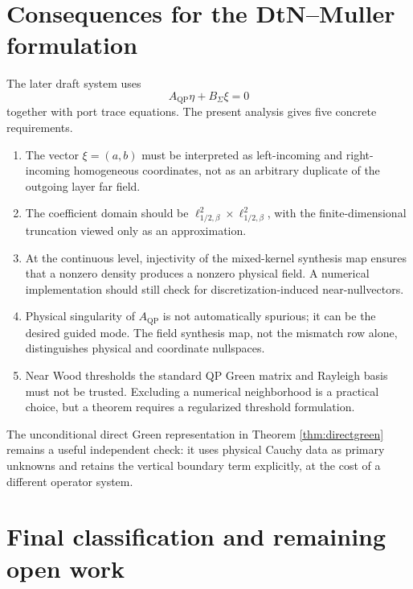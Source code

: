 \documentclass[11pt]{article}
\newcommand{\Sig}{\Sigma}
\newcommand{\QP}{\mathrm{QP}}
\theoremstyle{plain}
\theoremstyle{definition}
\theoremstyle{remark}
\begin{document}
\section{Consequences for the DtN--Muller formulation}

The later draft system uses
\[
A_{\QP}\eta+B_\Sig\xi=0
\]
together with port trace equations.  The present analysis gives five concrete
requirements.

\begin{enumerate}
\item The vector \(\xi=(a,b)\) must be interpreted as left-incoming and
right-incoming homogeneous coordinates, not as an arbitrary duplicate of the
outgoing layer far field.
\item The coefficient domain should be
\(\ell^2_{1/2,\beta}\times\ell^2_{1/2,\beta}\), with the finite-dimensional
truncation viewed only as an approximation.
\item At the continuous level, injectivity of the mixed-kernel synthesis map
ensures that a nonzero density produces a nonzero physical field.  A numerical
implementation should still check for discretization-induced near-nullvectors.
\item Physical singularity of \(A_{\QP}\) is not automatically spurious; it
can be the desired guided mode.  The field synthesis map, not the mismatch row
alone, distinguishes physical and coordinate nullspaces.
\item Near Wood thresholds the standard QP Green matrix and Rayleigh basis
must not be trusted.  Excluding a numerical neighborhood is a practical choice,
but a theorem requires a regularized threshold formulation.
\end{enumerate}

The unconditional direct Green representation in Theorem
\ref{thm:directgreen} remains a useful independent check: it uses physical
Cauchy data as primary unknowns and retains the vertical boundary term
explicitly, at the cost of a different operator system.

\section{Final classification and remaining open work}
\end{document}
